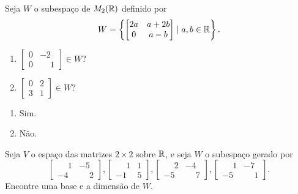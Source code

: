 \documentclass[12pt]{exam}
\begin{document}
\begin{exercicio}
	Seja $W$ o subespa\c{c}o de $M_2(\mathbb{R})$ definido por
	\[
	W = \left\{\begin{bmatrix}2a & a + 2b\\0 & a - b\end{bmatrix} \mid a, b \in \mathbb{R}\right\}.
	\]
	\begin{enumerate}[label={\alph*})]
		\item $\begin{bmatrix}0 & -2\\0 & \phantom{-} 1\end{bmatrix} \in W$?
		\item $\begin{bmatrix}0 & 2\\3 & 1\end{bmatrix} \in W$?
	\end{enumerate}
	\begin{solucao}
		\begin{enumerate}[label={\alph*})]
			\item Sim.
			\item N\~ao.
		\end{enumerate}
	\end{solucao}
\end{exercicio}

\begin{exercicio}
	Seja $V$ o espa\c{c}o das matrizes $2 \times 2$ sobre $\mathbb{R}$, e seja $W$ o subespa\c{c}o gerado por
	\[
	\begin{bmatrix}
		\phantom{-} 1 & -5\\
		-4 & \phantom{-} 2
	\end{bmatrix},
	\begin{bmatrix}
		\phantom{-} 1 & 1\\
		-1 & 5
	\end{bmatrix},
	\begin{bmatrix}
		\phantom{-} 2 & -4\\
		-5 & \phantom{-} 7
	\end{bmatrix},
	\begin{bmatrix}
		\phantom{-} 1 & -7\\
		-5 & \phantom{-} 1
	\end{bmatrix}.
	\]
	Encontre uma base e a dimens\~ao de $W$.
\end{exercicio}
\end{document}
